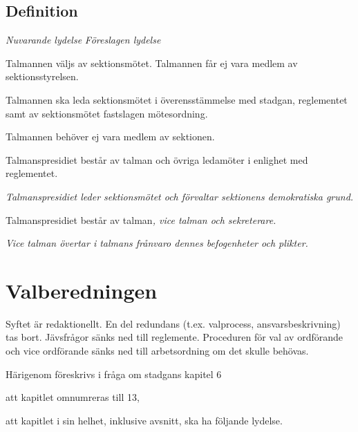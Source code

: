 \documentclass{article}
\newenvironment{lydelse}
    {\begin{paracol}{2}%
        \emph{Nuvarande lydelse}%
        \switchcolumn%
        \emph{Föreslagen lydelse}%
    \end{paracol}%
    \begin{enumerate}[label=\thesubsection.\arabic*]%
    \begin{paracol}{2}%
    }{\end{paracol}\end{enumerate}}
\begin{document}
\subsection{Definition}
\begin{lydelse}
  \setcounter{section}{5}
  \setcounter{subsection}{9}
  \item Talmannen väljs av sektionsmötet. Talmannen får ej vara medlem av sektionsstyrelsen.
  \item Talmannen ska leda sektionsmötet i överensstämmelse med stadgan, reglementet samt av sektionsmötet fastslagen mötesordning.
  \item Talmannen behöver ej vara medlem av sektionen.
  \item Talmanspresidiet består av talman och övriga ledamöter i enlighet med reglementet.
\switchcolumn
  \setcounter{section}{12}
  \item \emph{Talmanspresidiet leder sektionsmötet och förvaltar sektionens demokratiska grund.}
  \item Talmanspresidiet består av talman\emph{, vice talman och sekreterare.}
  \label{S:TalPStrukt}
  \item \emph{Vice talman övertar i talmans frånvaro dennes befogenheter och plikter.}
  \label{S:TalPViceTOrdf}
\end{lydelse}
\setcounter{section}{12}

\section{Valberedningen}
Syftet är redaktionellt.
En del redundans (t.ex. valprocess, ansvarsbeskrivning) tas bort.
Jävsfrågor sänks ned till reglemente.
Proceduren för val av ordförande och vice ordförande sänks ned till arbetsordning om det skulle behövas.

Härigenom föreskrivs i fråga om stadgans kapitel 6
\begin{dels}
  \item att kapitlet omnumreras till 13,
  \item att kapitlet i sin helhet, inklusive avsnitt, ska ha följande lydelse.
\end{dels}
\end{document}

